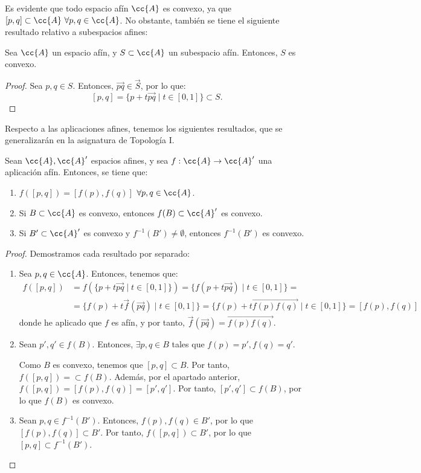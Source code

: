 Es evidente que todo espacio afín $\cc{A}$ es convexo, ya que $[p,q]\subset \cc{A}~\forall p,q\in \cc{A}$. No obstante, también se tiene el siguiente resultado relativo a subespacios afines:
\begin{prop}
    Sea $\cc{A}$ un espacio afín, y $S\subset \cc{A}$ un subespacio afín. Entonces, $S$ es convexo.
\end{prop}
\begin{proof}
    Sea $p,q\in S$. Entonces, $\vec{pq}\in \vec{S}$, por lo que:$$[p,q]=\{p+t\vec{pq}\mid t\in [0,1]\} \subset S.$$
\end{proof}

Respecto a las aplicaciones afines, tenemos los siguientes resultados, que se generalizarán en la asignatura de Topología I.
\begin{prop}
    Sean $\cc{A},\cc{A}'$ espacios afines, y sea $f:\cc{A}\to \cc{A}'$ una aplicación afín. Entonces, se tiene que:
    \begin{enumerate}
        \item $f([p,q])=[f(p),f(q)]$ \qquad $\forall p,q\in \cc{A}$.
        \item Si $B\subset \cc{A}$ es convexo, entonces $f(B)\subset \cc{A}'$ es convexo.
        \item Si $B'\subset \cc{A}'$ es convexo y $f^{-1}(B')\neq \emptyset$, entonces $f^{-1}(B')$ es convexo.
    \end{enumerate}
\end{prop}
\begin{proof}
    Demostramos cada resultado por separado:
    \begin{enumerate}
        \item Sea $p,q\in \cc{A}$. Entonces, tenemos que:
        \begin{equation*}
            \begin{split}
                f([p,q]) &= f(\{p+t\vec{pq}\mid t\in [0,1]\}) = \{f(p+t\vec{pq})\mid t\in [0,1]\} =\\&= \{f(p)+t\vec{f}(\vec{pq})\mid t\in [0,1]\}
            = \{f(p)+t\vec{f(p)f(q)}\mid t\in [0,1]\} = [f(p),f(q)]
            \end{split}
        \end{equation*}
        donde he aplicado que $f$ es afín, y por tanto, $\vec{f}(\vec{pq})=\vec{f(p)f(q)}$.

        \item Sean $p',q'\in f(B)$. Entonces, $\exists p,q\in B$ tales que $f(p)=p', f(q)=q'$.
        
        Como $B$ es convexo, tenemos que $[p,q]\subset B$. Por tanto, $f([p,q])=\subset f(B)$. Además, por el apartado anterior, $f([p,q])=[f(p),f(q)]=[p',q']$. Por tanto, $[p',q']\subset f(B)$, por lo que $f(B)$ es convexo.

        \item Sean $p,q\in f^{-1}(B')$. Entonces, $f(p),f(q)\in B'$, por lo que $[f(p),f(q)]\subset B'$. Por tanto, $f([p,q])\subset B'$, por lo que $[p,q]\subset f^{-1}(B')$.
    \end{enumerate}
\end{proof}


